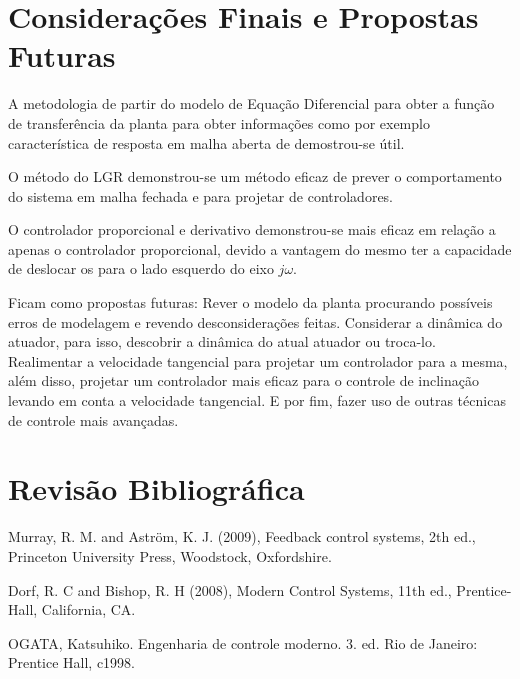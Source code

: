 \documentclass[conference,harvard,brazil,english]{sbatex}
\begin{document}
    \section{Considerações Finais e Propostas Futuras}
            
            A metodologia de partir do modelo de Equação Diferencial para obter a função de transferência da planta para obter informações como por exemplo característica de resposta em malha aberta de demostrou-se útil.
            
            O método do LGR demonstrou-se um método eficaz de prever o comportamento do sistema em malha fechada e para projetar de controladores.
            
            O controlador proporcional e derivativo demonstrou-se mais eficaz em relação a apenas o controlador proporcional, devido a vantagem do mesmo ter a capacidade de deslocar os para o lado esquerdo do eixo $j\omega$.
            
            Ficam como propostas futuras: Rever o modelo da planta procurando possíveis erros de modelagem e revendo desconsiderações feitas. Considerar a dinâmica do atuador, para isso, descobrir a dinâmica do atual atuador ou troca-lo.  Realimentar a velocidade tangencial para projetar um controlador para a mesma, além disso, projetar um controlador mais eficaz para o controle de inclinação levando em conta a velocidade tangencial. E por fim, fazer uso de outras técnicas de controle mais avançadas.
    
    \section{Revisão Bibliográfica}
    
        Murray, R. M. and Aström, K. J. (2009), Feedback control systems, 2th ed., Princeton University Press, Woodstock, Oxfordshire.
        
        Dorf, R. C and Bishop, R. H (2008), Modern Control Systems, 11th ed., Prentice-Hall, California, CA.
        
        OGATA, Katsuhiko. Engenharia de controle moderno. 3. ed. Rio de Janeiro: Prentice Hall, c1998.
        
\end{document}
